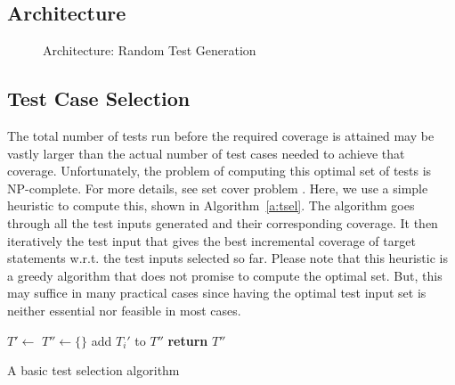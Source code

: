 \documentclass[12pts]{report}
\begin{document}
\subsection{Architecture}
\begin{figure}
\begin{center}
\end{center}
\caption{Architecture: Random Test Generation}
\label{f:rand-tg-arch}
\end{figure}

\subsection{Test Case Selection} \label{s:tsel}
The total number of tests run before the required coverage is attained may be vastly larger than the actual number of test cases needed to achieve that coverage. Unfortunately, the problem of computing this optimal set of tests is NP-complete. For more details, see set cover problem \cite{Karp1972}. Here, we use a simple heuristic to compute this, shown in Algorithm~\ref{a:tsel}. The algorithm goes through all the test inputs generated and their corresponding coverage. It then iteratively the test input that gives the best incremental coverage of target statements w.r.t. the test inputs selected so far. Please note that this heuristic is a greedy algorithm that does not promise to compute the optimal set. But, this may suffice in many practical cases since having the optimal test input set is neither essential nor feasible in most cases.

\begin{algorithm}
\begin{algorithmic}
\State $T' \gets$  
\State $T'' \gets \{\}$ 
	 
		\State add $T_i'$ to $T''$
	\EndIf
\EndFor
\State \textbf{return} $T''$
\EndProcedure
\end{algorithmic}
\caption{A basic test selection algorithm}
\label{a:tsel}
\end{algorithm}



\end{document}
